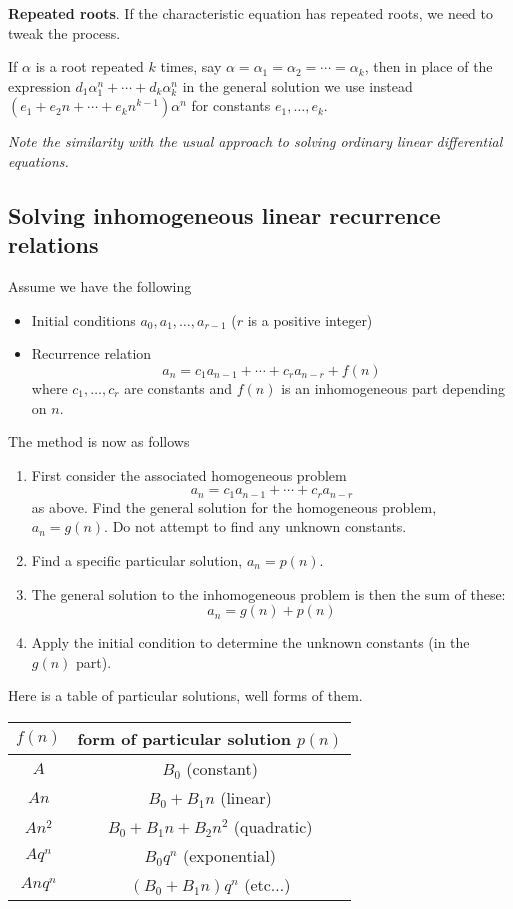 \documentclass[10pt, a4paper]{article}
\begin{document}
\textbf{Repeated roots}.
If the characteristic equation has repeated roots,
we need to tweak the process.

If $\alpha$ is a root repeated $k$ times,
say $\alpha = \alpha_1 = \alpha_2 = \dotsi = \alpha_k$,
then in place of the expression $d_1\alpha_1 ^ n + \dotsi + d_k\alpha_k ^ n$ in the general solution we use instead $(e_1 + e_2n + \dotsi + e_kn ^ {k - 1}) \alpha ^ n$ for constants $e_1, \dotsc, e_k$.

\textit{Note the similarity with the usual approach to solving ordinary linear differential equations.}

\subsection{Solving inhomogeneous linear recurrence relations}
Assume we have the following
\begin{itemize}
    \item Initial conditions $a_0, a_1, \dotsc, a_{r - 1}$
    ($r$ is a positive integer)
    \item Recurrence relation
    \[
    a_n = c_1a_{n - 1} + \dotsi + c_ra_{n - r} + f(n)
    \]
    where $c_1, \dotsc, c_r$ are constants and $f(n)$ is an inhomogeneous part depending on $n$.
\end{itemize}

The method is now as follows
\begin{enumerate}[label = \textbf{Step \arabic*}]
    \item First consider the associated homogeneous problem
    \[
    a_n = c_1a_{n - 1} + \dotsi + c_ra_{n - r}
    \]
    as above.
    Find the general solution for the homogeneous problem,
    $a_n = g(n)$.
    Do not attempt to find any unknown constants.
    \item Find a specific particular solution,
    $a_n = p(n)$.
    \item The general solution to the inhomogeneous problem is then the sum of these:
    \[
    a_n = g(n) + p(n)
    \]
    \item Apply the initial condition to determine the unknown constants
    (in the $g(n)$ part).
\end{enumerate}

Here is a table of particular solutions,
well forms of them.
\begin{table}[H]
    \centering
    \begin{tabular}{c|c}
         $f(n)$ & form of particular solution $p(n)$ \\
         \hline
         $A$ & $B_0$ (constant) \\
         $An$ & $B_0 + B_1n$ (linear) \\
         $An ^ 2$ & $B_0 + B_1n + B_2n ^ 2$ (quadratic) \\
         $Aq ^ n$ & $B_0q ^ n$ (exponential) \\
         $Anq ^ n$ & $(B_0 + B_1n)q ^ n$ (etc$\dotsc$)
    \end{tabular}
\end{table}
\end{document}
